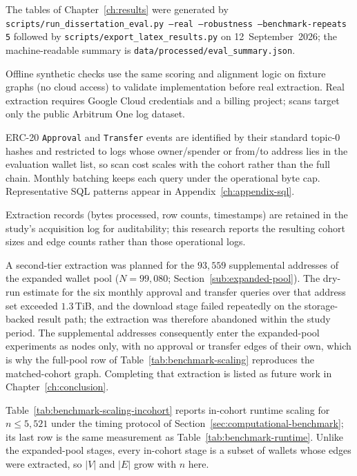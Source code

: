 The tables of Chapter~\ref{ch:results} were generated by \texttt{scripts/run\_dissertation\_eval.py --real --robustness --benchmark-repeats 5} followed by \texttt{scripts/export\_latex\_results.py} on 12~September~2026; the machine-readable summary is \texttt{data/processed/eval\_summary.json}.

Offline synthetic checks use the same scoring and alignment logic on fixture graphs (no cloud access) to validate implementation before real extraction. Real extraction requires Google Cloud credentials and a billing project; scans target only the public Arbitrum One log dataset.


ERC-20 \texttt{Approval} and \texttt{Transfer} events are identified by their standard topic-$0$ hashes and restricted to logs whose owner/spender or from/to address lies in the evaluation wallet list, so scan cost scales with the cohort rather than the full chain. Monthly batching keeps each query under the operational byte cap. Representative SQL patterns appear in Appendix~\ref{ch:appendix-sql}.

Extraction records (bytes processed, row counts, timestamps) are retained in the study's acquisition log for auditability; this research reports the resulting cohort sizes and edge counts rather than those operational logs.

A second-tier extraction was planned for the $93{,}559$ supplemental addresses of the expanded wallet pool ($N=99{,}080$; Section~\ref{sub:expanded-pool}). The dry-run estimate for the six monthly approval and transfer queries over that address set exceeded $1.3$\,TiB, and the download stage failed repeatedly on the storage-backed result path; the extraction was therefore abandoned within the study period. The supplemental addresses consequently enter the expanded-pool experiments as nodes only, with no approval or transfer edges of their own, which is why the full-pool row of Table~\ref{tab:benchmark-scaling} reproduces the matched-cohort graph. Completing that extraction is listed as future work in Chapter~\ref{ch:conclusion}.


Table~\ref{tab:benchmark-scaling-incohort} reports in-cohort runtime scaling for $n \leq 5{,}521$ under the timing protocol of Section~\ref{sec:computational-benchmark}; its last row is the same measurement as Table~\ref{tab:benchmark-runtime}. Unlike the expanded-pool stages, every in-cohort stage is a subset of wallets whose edges were extracted, so $|V|$ and $|E|$ grow with $n$ here.

